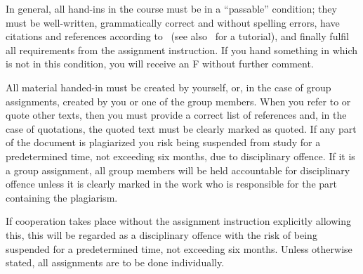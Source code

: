 \mode*


In general, all hand-ins in the course must be in a \enquote{passable} 
condition; \ie they must be well-written, grammatically correct and without 
spelling errors, have citations and references according to~\cite{IEEEcitation} 
(see also~\cite{PurdueCitation} for a tutorial), and finally fulfil all 
requirements from the assignment instruction.
If you hand something in which is not in this condition, you will receive an 
F without further comment.

All material handed-in must be created by yourself, or, in the case of group 
assignments, created by you or one of the group members.
When you refer to or quote other texts, then you must provide a correct list of 
references and, in the case of quotations, the quoted text must be clearly 
marked as quoted.
If any part of the document is plagiarized you risk being suspended from study 
for a predetermined time, not exceeding six months, due to disciplinary 
offence.
If it is a group assignment, all group members will be held accountable for 
disciplinary offence unless it is clearly marked in the work who is responsible 
for the part containing the plagiarism.

If cooperation takes place without the assignment instruction explicitly 
allowing this, this will be regarded as a disciplinary offence with the risk of
being suspended for a predetermined time, not exceeding six months.
Unless otherwise stated, all assignments are to be done individually.
